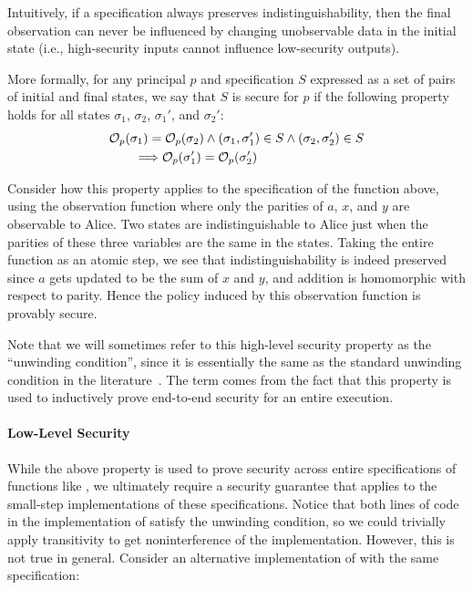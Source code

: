 \noindent{}Intuitively, if a specification always preserves indistinguishability, 
then the final observation can never be influenced by changing
unobservable data in the initial state (i.e., high-security inputs cannot 
influence low-security outputs).

More formally, for any principal $p$ and specification $S$ expressed as
a set of pairs of initial and final states,
we say that $S$ is secure for $p$ if the following property holds for all 
states $\sigma_1$, $\sigma_2$, $\sigma_1'$, and $\sigma_2'$:
{\small
\begin{align*}
& \mathcal{O}_{p}(\sigma_1) = \mathcal{O}_{p}(\sigma_2) \land
(\sigma_1,\sigma_1') \in S \land (\sigma_2,\sigma_2') \in S \\
& \qquad \Longrightarrow
\mathcal{O}_{p}(\sigma_1') = \mathcal{O}_{p}(\sigma_2')
\end{align*}}%

\noindent{}Consider 
how this property applies to the specification of the 
 function above, using
the observation function where only the parities of $a$, $x$, and $y$
are observable to Alice. Two states are indistinguishable to Alice just
when the parities of these three variables are the same in the
states. Taking the entire function as an atomic step, we see that 
indistinguishability is indeed preserved since
$a$ gets updated to be the sum of $x$ and $y$, and addition is
homomorphic with respect to parity. Hence the policy induced by
this observation function is provably secure.

Note that we will sometimes refer to this high-level security 
property as the ``unwinding condition'', since it is essentially
the same as the standard unwinding condition in the 
literature~\cite{goguen82,goguen84}. The term
comes from the fact that this property is used to inductively
prove end-to-end security for an entire execution.

\paragraph{Low-Level Security}
While the above property is used to prove security
across entire specifications of functions like , we
ultimately require a security guarantee that applies to the 
small-step implementations of these specifications. Notice that 
both lines of code in the implementation of  satisfy
the unwinding condition, so we could trivially apply transitivity to get
noninterference of the implementation. However, this is not true in 
general. Consider an alternative implementation of 
with the same specification:


